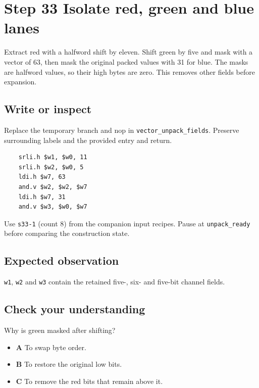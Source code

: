 \section{Step 33 Isolate red, green and blue lanes}\label{rgb-s33}

Extract red with a halfword shift by eleven. Shift green by five and mask with a vector of 63, then mask the original packed values with 31 for blue. The masks are halfword values, so their high bytes are zero. This removes other fields before expansion.

\subsection{Write or inspect}
Replace the temporary branch and nop in \texttt{vector\_unpack\_fields}. Preserve surrounding labels and the provided entry and return.

\begin{verbatim}
    srli.h $w1, $w0, 11
    srli.h $w2, $w0, 5
    ldi.h $w7, 63
    and.v $w2, $w2, $w7
    ldi.h $w7, 31
    and.v $w3, $w0, $w7
\end{verbatim}
Use \texttt{s33-1} (count 8) from the companion input recipes. Pause at \texttt{unpack\_ready} before comparing the construction state.

\subsection{Expected observation}
\texttt{w1}, \texttt{w2} and \texttt{w3} contain the retained five-, six- and five-bit channel fields.

\subsection{Check your understanding}
Why is green masked after shifting?

\begin{itemize}
  \item \textbf{A} To swap byte order.
  \item \textbf{B} To restore the original low bits.
  \item \textbf{C} To remove the red bits that remain above it.
\end{itemize}
